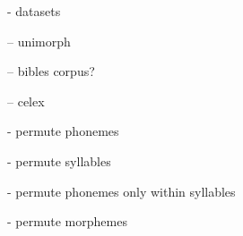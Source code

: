 - datasets

-- unimorph

-- bibles corpus?

-- celex


- permute phonemes

- permute syllables

- permute phonemes only within syllables

- permute morphemes 


